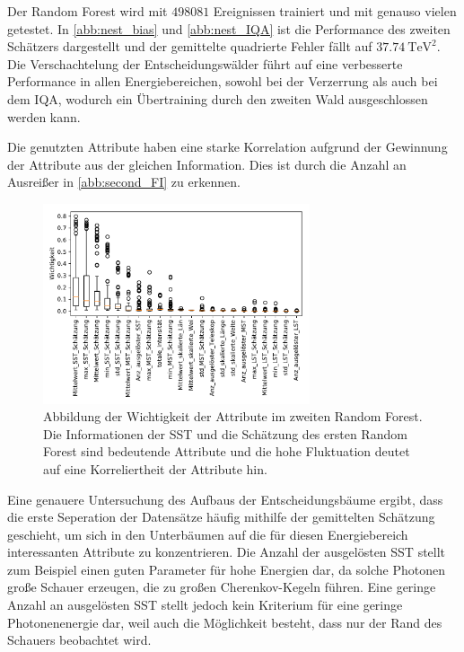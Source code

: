 Der Random Forest wird mit $\num{498081}$ Ereignissen trainiert und mit genauso vielen getestet.
In \autoref{abb:nest_bias} und \autoref{abb:nest_IQA} ist die Performance des zweiten Schätzers dargestellt und der gemittelte quadrierte Fehler fällt
auf $\SI{37.74}{\tera\eV\squared}$.
Die Verschachtelung der Entscheidungswälder führt auf eine verbesserte Performance in allen Energiebereichen, sowohl bei der Verzerrung als auch bei dem IQA,
wodurch ein Übertraining durch den zweiten Wald ausgeschlossen werden kann.

Die genutzten Attribute haben eine starke Korrelation aufgrund der Gewinnung der Attribute aus der gleichen Information.
Dies ist durch die Anzahl an Ausreißer in \autoref{abb:second_FI} zu erkennen.
\begin{figure}
  \includegraphics[width=0.7\textwidth]{Plots/feautureimportance_boxplot_secondForest.pdf}
  \centering
  \caption{Abbildung der Wichtigkeit der Attribute im zweiten Random Forest. Die Informationen der SST und die
          Schätzung des ersten Random Forest sind bedeutende Attribute und die hohe Fluktuation deutet auf eine
          Korreliertheit der Attribute hin.}
  \label{abb:second_FI}
\end{figure}
Eine genauere Untersuchung des Aufbaus der Entscheidungsbäume ergibt, dass die erste Seperation der Datensätze häufig mithilfe der gemittelten Schätzung geschieht,
um sich in den Unterbäumen auf die für diesen Energiebereich interessanten Attribute zu konzentrieren.
Die Anzahl der ausgelösten SST stellt zum Beispiel einen guten Parameter für hohe Energien dar, da solche Photonen große Schauer erzeugen, die
zu großen Cherenkov-Kegeln führen.
Eine geringe Anzahl an ausgelösten SST stellt jedoch kein Kriterium für eine geringe Photonenenergie dar, weil auch die Möglichkeit besteht, dass nur der
Rand des Schauers beobachtet wird.

